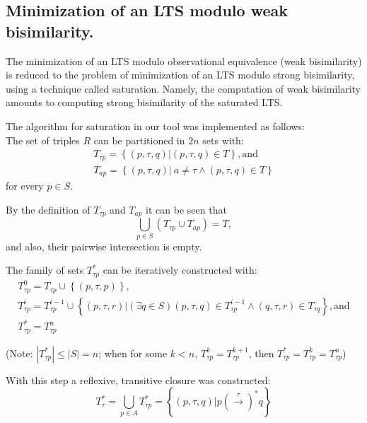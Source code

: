 \subsection{Minimization of an LTS modulo weak bisimilarity.}
The minimization of an LTS modulo observational equivalence (weak bisimilarity) is reduced to the problem of minimization of an LTS modulo strong bisimilarity, using a technique called saturation. Namely, the computation of weak bisimilarity amounts to computing strong bisimilarity of the saturated LTS. 

The algorithm for saturation in our tool was implemented as follows:\\
The set of triples ${R}$ can be partitioned in ${2n}$ sets with: 
\begin{equation*}
	\begin{array}{lcl}
 		{T_{\tau p}=\left\{\left(p,\tau,q\right)| \left(p,\tau,q\right)\in T\right\}}, \text{and}\\
    {T_{ap}=\left\{\left(p,\tau,q\right)|\ a\neq\tau\wedge\left(p,\tau,q\right)\in T\right\}}
  \end{array}
\end{equation*} 
for every ${p\in S}$.

By the definition of ${T_{\tau p}}$ and ${T_{ap}}$ it can be seen that
\begin{equation*}
 {\bigcup_{p\in S}\left(T_{\tau p}\cup T_{ap}\right)=T},
\end{equation*} 
and also, their pairwise intersection is empty. 

The family of sets ${T^{*}_{\tau p}}$ can be iteratively constructed with:
\begin{equation*}
	\begin{array}{lcl}
		{T^{0}_{\tau p}=T_{\tau p}\cup\left\{\left(p,\tau,p\right)\right\}},\\
		{T^{i}_{\tau p}=T^{i-1}_{\tau p}\cup\left\{\left(p,\tau,r\right)|\left(\exists q\in S\right)\left(p,\tau,q\right)\in T^{i-1}_{\tau p}\wedge\left(q,\tau,r\right)\in T_{\tau q}\right\}}, \text{and} \\
		{T^{*}_{\tau p}=T^{n}_{\tau p}}
	\end{array}
\end{equation*}

(Note: ${\left|T^{*}_{\tau p}\right|\leq\left|S\right|=n}$; when for some ${k<n}$, ${T^{k}_{\tau p}=T^{k+1}_{\tau p}}$, then ${T^{*}_{\tau p}=T^{k}_{\tau p}=T^{n}_{\tau p}}$)

With this step a reflexive, transitive closure was constructed:
\begin{equation*}
	{T^{*}_{\tau}=\bigcup_{p\in A}T^{*}_{\tau p}=\left\{\left(p,\tau,q\right)|p\left(\stackrel{\tau}{\rightarrow}\right)^{*}q\right\}}
\end{equation*}

